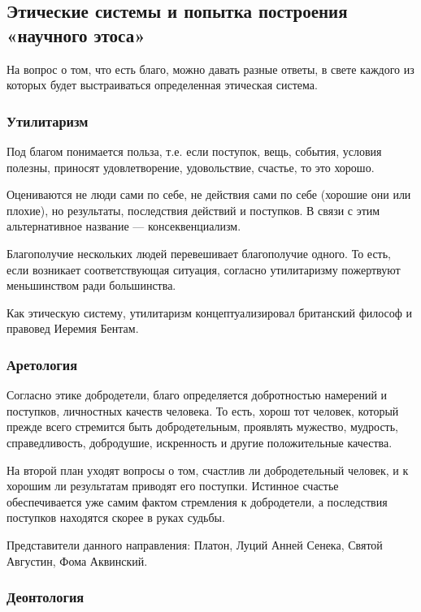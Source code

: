 \subsection{Этические системы и попытка построения «научного этоса»}

На вопрос о том, что есть благо, можно давать разные ответы, в свете каждого из которых
будет выстраиваться определенная этическая система. 

\subsubsection{Утилитаризм}
Под благом понимается польза, т.е. если поступок, вещь, события, условия полезны, приносят удовлетворение, удовольствие, счастье, то это хорошо.

Оцениваются не люди сами по себе, не
действия сами по себе (хорошие они или плохие), но результаты, последствия действий и поступков. 
В связи с этим альтернативное название --- консеквенциализм.

Благополучие нескольких людей перевешивает благополучие одного. То есть, если возникает соответствующая ситуация, согласно утилитаризму пожертвуют меньшинством ради большинства.

Как этическую систему, утилитаризм концептуализировал британский
философ и правовед Иеремия Бентам.

\subsubsection{Аретология}

Согласно этике добродетели, благо определяется добротностью намерений и поступков, личностных
качеств человека. То есть, хорош тот человек, который прежде всего стремится
быть добродетельным, проявлять мужество, мудрость, справедливость, добродушие,
искренность и другие положительные качества. 

На второй план уходят вопросы о том, счастлив ли добродетельный человек, и к хорошим ли результатам приводят его поступки. Истинное счастье обеспечивается уже самим фактом стремления к добродетели, а последствия поступков находятся скорее в руках судьбы.

Представители данного направления: Платон, Луций Анней Сенека, Святой Августин, Фома Аквинский. 

\subsubsection{Деонтология}

